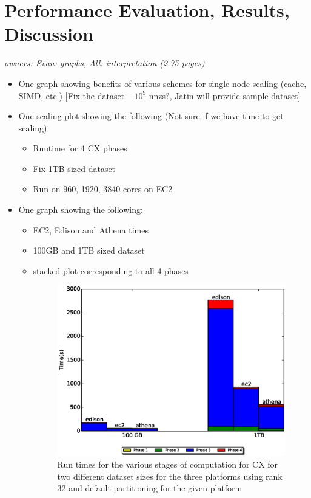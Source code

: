 
\section{Performance Evaluation, Results, Discussion}

\textit{owners: Evan: graphs, All: interpretation (2.75 pages)}
\begin{itemize}
  \item One graph showing benefits of various schemes for single-node scaling (cache, SIMD, etc.) [Fix the dataset -- $10^9$ nnzs?, Jatin will provide sample dataset]
  \item One scaling plot showing the following (Not sure if we have time to get scaling):
  \begin{itemize}
    \item Runtime for 4 CX phases
    \item Fix 1TB sized dataset
    \item Run on 960, 1920, 3840 cores on EC2  
  \end{itemize}

  \item One graph showing the following:
  \begin{itemize}
    \item EC2, Edison and Athena times
    \item 100GB and 1TB sized dataset
    \item stacked plot corresponding to all 4 phases
    \begin{figure} [h]
    \begin{centering}
    \includegraphics[scale=0.4]{images/CX_Size_Scaling_Rank_16_Partitions_default.eps}
    \end{centering}
    \caption{ Run times for the various stages of computation for CX for two different dataset sizes for the three platforms using rank 32 and default partitioning for the given platform} 
    \end{figure}
   

\end{itemize}
\end{itemize}
